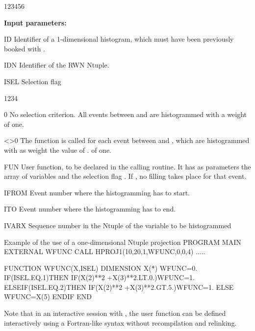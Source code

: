 \begin{DLtt}{123456}
\item[{\rm\bf Input parameters:}]
\item[ID]    Identifier of a 1-dimensional histogram, which
             must have been previously booked with .
\item[IDN]   Identifier of the RWN Ntuple.
\item[ISEL]  Selection flag
             \begin{DLtt}{1234}
                \item[0]   No selection criterion. All events between  and
                            are histogrammed with a weight of one.
                \item[<>0] The function  is called for each event
                           between  and , which are histogrammed
                           with as weight the value of . of one.
             \end{DLtt}
\item[FUN]   User function, to be declared  in the calling
             routine. It has as parameters the array of variables  and the
             selection flag . If ,
             no filling takes place for that event.
\item[IFROM] Event number where the histogramming has to start.
\item[ITO]   Event number where the histogramming has to end.
\item[IVARX] Sequence number in the Ntuple of the variable to be
             histogrammed
\end{DLtt}

\begin{XMPt}{Example of the use of a one-dimensional Ntuple projection}
     PROGRAM MAIN
     EXTERNAL WFUNC
     CALL HPROJ1(10,20,1,WFUNC,0,0,4)
     .....

     FUNCTION WFUNC(X,ISEL)
     DIMENSION X(*)
     WFUNC=0.
     IF(ISEL.EQ.1)THEN
         IF(X(2)**2 +X(3)**2.LT.0.)WFUNC=1.
     ELSEIF(ISEL.EQ.2)THEN
         IF(X(2)**2 +X(3)**2.GT.5.)WFUNC=1.
     ELSE
         WFUNC=X(5)
     ENDIF
     END
\end{XMPt}

Note that in an interactive session with \PAW{},
the user function  can be defined
interactively using a Fortran-like syntax without recompilation
and relinking.
 
 
